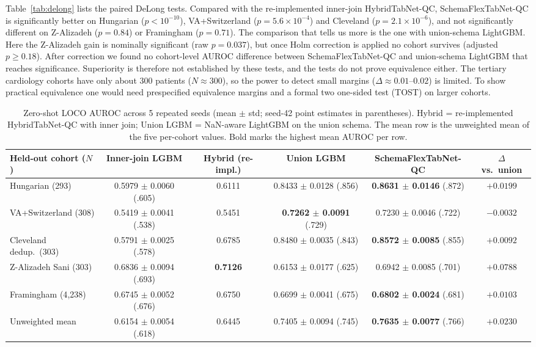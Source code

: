 \documentclass[conference]{IEEEtran}
\newcommand{\sfn}{SchemaFlexTabNet-QC}
\newcommand{\htn}{HybridTabNet-QC}
\begin{document}
Table~\ref{tab:delong} lists the paired DeLong tests. Compared with the re-implemented inner-join \htn{}, \sfn{} is significantly better on Hungarian ($p<10^{-10}$), VA+Switzerland ($p{=}5.6\times10^{-4}$) and Cleveland ($p{=}2.1\times10^{-6}$), and not significantly different on Z-Alizadeh ($p{=}0.84$) or Framingham ($p{=}0.71$). The comparison that tells us more is the one with union-schema LightGBM. Here the Z-Alizadeh gain is nominally significant (raw $p{=}0.037$), but once Holm correction is applied no cohort survives (adjusted $p\ge 0.18$). After correction we found no cohort-level AUROC difference between \sfn{} and union-schema LightGBM that reaches significance. Superiority is therefore not established by these tests, and the tests do not prove equivalence either. The tertiary cardiology cohorts have only about 300 patients ($N\approx 300$), so the power to detect small margins ($\Delta\approx 0.01$--$0.02$) is limited. To show practical equivalence one would need prespecified equivalence margins and a formal two one-sided test (TOST) on larger cohorts.

\begin{table}[t]
\caption{Zero-shot LOCO AUROC across 5 repeated seeds (mean $\pm$ std; seed-42 point estimates in parentheses). Hybrid = re-implemented \htn{} with inner join; Union LGBM = NaN-aware LightGBM on the union schema. The mean row is the unweighted mean of the five per-cohort values. Bold marks the highest mean AUROC per row.}
\label{tab:loco}
\centering\footnotesize
\begin{tabular}{lccccc}
\toprule
Held-out cohort ($N$) & Inner-join LGBM & Hybrid (re-impl.) & Union LGBM & \sfn{} & $\Delta$ vs.\ union\\
\midrule
Hungarian (293) & 0.5979 $\pm$ 0.0060 (.605) & 0.6111 & 0.8433 $\pm$ 0.0128 (.856) & \textbf{0.8631 $\pm$ 0.0146} (.872) & $+0.0199$\\
VA+Switzerland (308) & 0.5419 $\pm$ 0.0041 (.538) & 0.5451 & \textbf{0.7262 $\pm$ 0.0091} (.729) & 0.7230 $\pm$ 0.0046 (.722) & $-0.0032$\\
Cleveland dedup.\ (303) & 0.5791 $\pm$ 0.0025 (.578) & 0.6785 & 0.8480 $\pm$ 0.0035 (.843) & \textbf{0.8572 $\pm$ 0.0085} (.855) & $+0.0092$\\
Z-Alizadeh Sani (303) & 0.6836 $\pm$ 0.0094 (.693) & \textbf{0.7126} & 0.6153 $\pm$ 0.0177 (.625) & 0.6942 $\pm$ 0.0085 (.701) & $+0.0788$\\
Framingham (4{,}238) & 0.6745 $\pm$ 0.0052 (.676) & 0.6750 & 0.6699 $\pm$ 0.0041 (.675) & \textbf{0.6802 $\pm$ 0.0024} (.681) & $+0.0103$\\
\midrule
Unweighted mean & 0.6154 $\pm$ 0.0054 (.618) & 0.6445 & 0.7405 $\pm$ 0.0094 (.745) & \textbf{0.7635 $\pm$ 0.0077} (.766) & $+0.0230$\\
\bottomrule
\end{tabular}
\end{table}
\end{document}
